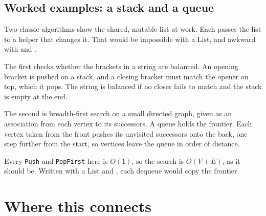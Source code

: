 \subsection{Worked examples: a stack and a queue}
\label{ssec:ds-ll-worked}

Two classic algorithms show the shared, mutable list at work. Each passes the list to
a helper that changes it. That would be impossible with a List, and awkward with
 and .

The first checks whether the brackets in a string are balanced. An opening bracket is
pushed on a stack, and a closing bracket must match the opener on top, which it pops.
The string is balanced if no closer fails to match and the stack is empty at the end.

\begin{codepairs}
\end{codepairs}

The second is breadth-first search on a small directed
graph, given as an association from each vertex to its successors. A queue holds the
frontier. Each vertex taken from the front pushes its unvisited successors onto the
back, one step further from the start, so vertices leave the queue in order of
distance.

\begin{codepairs}
\end{codepairs}

Every \texttt{Push} and \texttt{PopFirst} here is \(O(1)\), so the search is \(O(V+E)\), as it
should be. Written with a List and , each dequeue would copy the frontier.


\section*{Where this connects}

